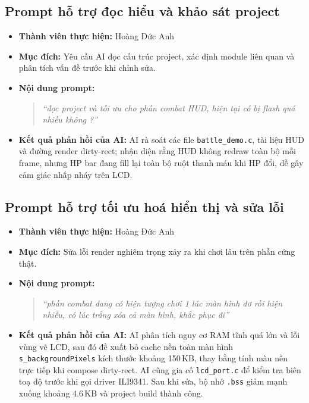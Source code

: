 \documentclass[a4paper,12pt]{report}
\begin{document}
\subsection{Prompt hỗ trợ đọc hiểu và khảo sát project}

\begin{itemize}
    \item \textbf{Thành viên thực hiện:} Hoàng Đức Anh
    \item \textbf{Mục đích:} Yêu cầu AI đọc cấu trúc project, xác định module liên quan và phân tích vấn đề trước khi chỉnh sửa.
    \item \textbf{Nội dung prompt:}
    \begin{quote}
    \textit{``đọc project và tối ưu cho phần combat HUD, hiện tại có bị flash quá nhiều không ?''}
    \end{quote}
    \item \textbf{Kết quả phản hồi của AI:} AI rà soát các file \texttt{battle\_demo.c}, tài liệu HUD và đường render dirty-rect; nhận diện rằng HUD không redraw toàn bộ mỗi frame, nhưng HP bar đang fill lại toàn bộ ruột thanh máu khi HP đổi, dễ gây cảm giác nhấp nháy trên LCD.
\end{itemize}

\subsection{Prompt hỗ trợ tối ưu hoá hiển thị và sửa lỗi}

\begin{itemize}
    \item \textbf{Thành viên thực hiện:} Hoàng Đức Anh
    \item \textbf{Mục đích:} Sửa lỗi render nghiêm trọng xảy ra khi chơi lâu trên phần cứng thật.
    \item \textbf{Nội dung prompt:}
    \begin{quote}
    \textit{``phần combat đang có hiện tượng chơi 1 lúc màn hình đơ rồi hiện nhiễu, có lúc trắng xóa cả màn hình, khắc phục đi''}
    \end{quote}
    \item \textbf{Kết quả phản hồi của AI:} AI phân tích nguy cơ RAM tĩnh quá lớn và lỗi vùng vẽ LCD, sau đó đề xuất bỏ cache nền toàn màn hình \texttt{s\_backgroundPixels} kích thước khoảng 150\,KB, thay bằng tính màu nền trực tiếp khi compose dirty-rect. AI cũng gia cố \texttt{lcd\_port.c} để kiểm tra biên toạ độ trước khi gọi driver ILI9341. Sau khi sửa, bộ nhớ \texttt{.bss} giảm mạnh xuống khoảng 4.6\,KB và project build thành công.
\end{itemize}
\end{document}
